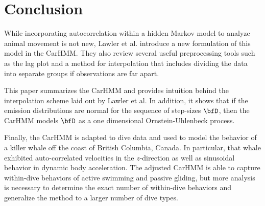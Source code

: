 
\section{Conclusion}

While incorporating autocorrelation within a hidden Markov model to analyze animal movement is not new, Lawler et al. introduce a new formulation of this model in the CarHMM. They also review several useful preprocessing tools such as the lag plot and a method for interpolation that includes dividing the data into separate groups if observations are far apart. 

This paper summarizes the CarHMM and provides intuition behind the interpolation scheme laid out by Lawler et al. In addition, it shows that if the emission distributions are normal for the sequence of step-sizes $\bfD$, then the CarHMM models $\bfD$ as a one dimensional Ornstein-Uhlenbeck process.

Finally, the CarHMM is adapted to dive data and used to model the behavior of a killer whale off the coast of British Columbia, Canada. In particular, that whale exhibited auto-correlated velocities in the $z$-direction as well as sinusoidal behavior in dynamic body acceleration. The adjusted CarHMM is able to capture within-dive behaviors of active swimming and passive gliding, but more analysis is necessary to determine the exact number of within-dive behaviors and generalize the method to a larger number of dive types.